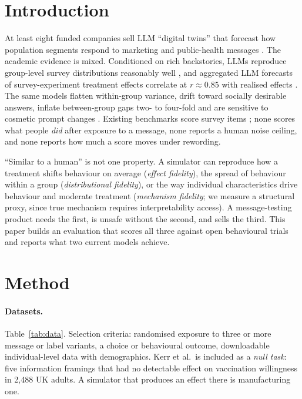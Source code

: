 \documentclass[10pt,twocolumn]{article}
\begin{document}
\section{Introduction}
At least eight funded companies sell LLM ``digital twins'' that forecast how population segments respond to marketing and public-health messages \cite{compnote}. The academic evidence is mixed. Conditioned on rich backstories, LLMs reproduce group-level survey distributions reasonably well \cite{argyle2023,park2024}, and aggregated LLM forecasts of survey-experiment treatment effects correlate at $r\approx0.85$ with realised effects \cite{hewitt2024}. The same models flatten within-group variance, drift toward socially desirable answers, inflate between-group gaps two- to four-fold and are sensitive to cosmetic prompt changes \cite{wang2024,bisbee2024,salecha2024,chen2026fail}. Existing benchmarks score survey items \cite{santurkar2023,suh2025,toubia2025,hu2026}; none scores what people \emph{did} after exposure to a message, none reports a human noise ceiling, and none reports how much a score moves under rewording.

``Similar to a human'' is not one property. A simulator can reproduce how a treatment shifts behaviour on average (\emph{effect fidelity}), the spread of behaviour within a group (\emph{distributional fidelity}), or the way individual characteristics drive behaviour and moderate treatment (\emph{mechanism fidelity}; we measure a structural proxy, since true mechanism requires interpretability access). A message-testing product needs the first, is unsafe without the second, and sells the third. This paper builds an evaluation that scores all three against open behavioural trials and reports what two current models achieve.

\section{Method}
\paragraph{Datasets.} Table~\ref{tab:data}. Selection criteria: randomised exposure to three or more message or label variants, a choice or behavioural outcome, downloadable individual-level data with demographics. Kerr et al.\ is included as a \emph{null task}: five information framings that had no detectable effect on vaccination willingness in 2,488 UK adults. A simulator that produces an effect there is manufacturing one.
\end{document}
